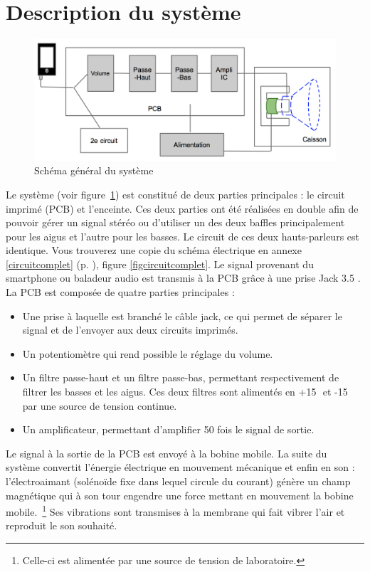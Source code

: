 \section{Description du système}

\begin{figure}[h]
\begin{center}
\includegraphics[width=\textwidth]{img/schemacomplet} 
\end{center}
\caption{Schéma général du système}		
\label{fig:schemacomplet}		
\end{figure}

Le système (voir figure~\ref{fig:schemacomplet}) est constitué de deux parties principales : le circuit imprimé (PCB) et l'enceinte. 
Ces deux parties ont été réalisées en double afin de pouvoir gérer un signal stéréo ou d'utiliser un des deux baffles principalement pour les aigus et l'autre pour les basses. Le circuit de ces deux hauts-parleurs est identique. Vous trouverez une copie du schéma électrique en annexe \ref{circuitcomplet} (p. \pageref{circuitcomplet}), figure \ref{figcircuitcomplet}.
Le signal provenant du smartphone ou baladeur audio est transmis à la PCB grâce à une prise Jack 3.5 \milli\meter.
La PCB est composée de quatre parties principales :
\begin{itemize}
\item Une prise à laquelle est branché le câble jack, ce qui permet de séparer le signal et de l'envoyer aux deux circuits imprimés.
\item Un potentiomètre qui rend possible le réglage du volume.
\item Un filtre passe-haut et un filtre passe-bas, permettant respectivement de filtrer les basses et les aigus. Ces deux filtres sont alimentés en +15\,\volt \, et -15\,\volt \, par une source de tension continue.
\item Un amplificateur, permettant d'amplifier 50 fois le signal de sortie.
\end{itemize}
Le signal à la sortie de la PCB est envoyé à la bobine mobile. La suite du système convertit l'énergie électrique en mouvement mécanique et enfin en son : 
l'électroaimant (solénoïde fixe dans lequel circule du courant) génère un champ magnétique qui à son tour engendre une force mettant en mouvement la bobine mobile.~\footnote{Celle-ci est alimentée par une source de tension de laboratoire.}
Ses vibrations sont transmises à la membrane qui fait vibrer l'air et reproduit le son souhaité.

